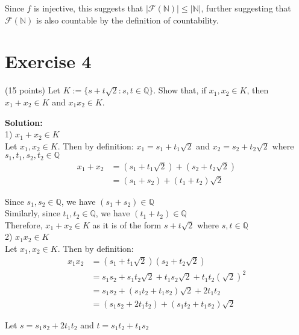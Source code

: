 \documentclass{article}
\begin{document}
Since $f$ is injective, this suggests that $|\mathcal{F}(\mathbb{N})| \leq |\mathbb{N}|$, further suggesting that $\mathcal{F}(\mathbb{N})$ is also countable by the definition of countability.

\newpage

\section*{Exercise 4}
(15 points) Let $K := \{s + t\sqrt{2} : s,t \in \mathbb{Q}\}$. Show that, if $x_1, x_2 \in K$, then $x_1 + x_2 \in K$ and $x_1x_2 \in K$.

\textbf{Solution:} \\

1) $x_1 + x_2 \in K$ \\

Let $x_1, x_2 \in K$. Then by definition:
$x_1 = s_1 + t_1\sqrt{2}$ and $x_2 = s_2 + t_2\sqrt{2}$ where $s_1, t_1, s_2, t_2 \in \mathbb{Q}$ \\

\begin{align*}
x_1 + x_2 &= (s_1 + t_1\sqrt{2}) + (s_2 + t_2\sqrt{2}) \\
&= (s_1 + s_2) + (t_1 + t_2)\sqrt{2}
\end{align*}

Since $s_1, s_2 \in \mathbb{Q}$, we have $(s_1 + s_2) \in \mathbb{Q}$ \\

Similarly, since $t_1, t_2 \in \mathbb{Q}$, we have $(t_1 + t_2) \in \mathbb{Q}$ \\

Therefore, $x_1 + x_2 \in K$ as it is of the form $s + t\sqrt{2}$ where $s, t \in \mathbb{Q}$ \\

2) $x_1x_2 \in K$ \\

Let $x_1, x_2 \in K$. Then by definition:
\begin{align*}
x_1x_2 &= (s_1 + t_1\sqrt{2})(s_2 + t_2\sqrt{2}) \\
&= s_1s_2 + s_1t_2\sqrt{2} + t_1s_2\sqrt{2} + t_1t_2(\sqrt{2})^2 \\
&= s_1s_2 + (s_1t_2 + t_1s_2)\sqrt{2} + 2t_1t_2 \\
&= (s_1s_2 + 2t_1t_2) + (s_1t_2 + t_1s_2)\sqrt{2}
\end{align*}

Let $s = s_1s_2 + 2t_1t_2$ and $t = s_1t_2 + t_1s_2$ \\
\end{document}
